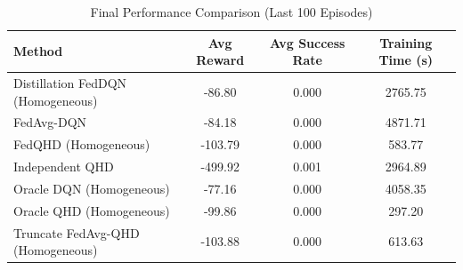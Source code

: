 \begin{table}[t]
\centering
\caption{Final Performance Comparison (Last 100 Episodes)}
\label{tab:performance_summary}
\begin{tabular}{lccc}
\toprule
Method & Avg Reward & Avg Success Rate & Training Time (s) \\
\midrule
Distillation FedDQN (Homogeneous) & -86.80 & 0.000 & 2765.75 \\
FedAvg-DQN & -84.18 & 0.000 & 4871.71 \\
FedQHD (Homogeneous) & -103.79 & 0.000 & 583.77 \\
Independent QHD & -499.92 & 0.001 & 2964.89 \\
Oracle DQN (Homogeneous) & -77.16 & 0.000 & 4058.35 \\
Oracle QHD (Homogeneous) & -99.86 & 0.000 & 297.20 \\
Truncate FedAvg-QHD (Homogeneous) & -103.88 & 0.000 & 613.63 \\
\bottomrule
\end{tabular}
\end{table}